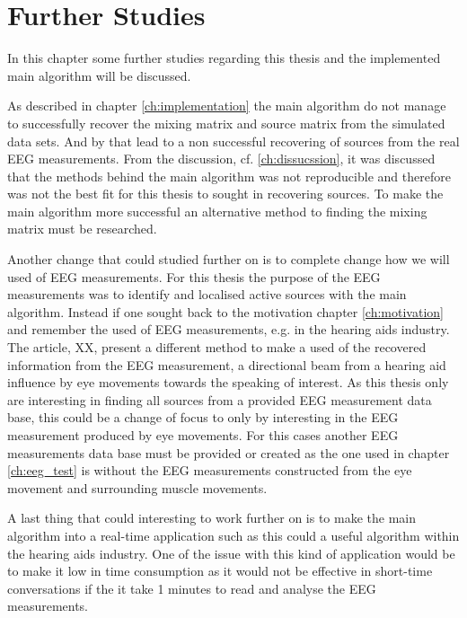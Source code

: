 \chapter{Further Studies}
In this chapter some further studies regarding this thesis and the implemented main algorithm will be discussed.

As described in chapter \ref{ch:implementation} the main algorithm do not manage to successfully recover the mixing matrix and source matrix from the simulated data sets. And by that lead to a non successful recovering of sources from the real EEG measurements. 
From the discussion, cf. \ref{ch:dissucssion}, it was discussed that the methods behind the main algorithm was not reproducible and therefore was not the best fit for this thesis to sought in recovering sources. 
To make the main algorithm more successful an alternative method to finding the mixing matrix must be researched.

Another change that could studied further on is to complete change how we will used of EEG measurements. For this thesis the purpose of the EEG measurements was to identify and localised active sources with the main algorithm. 
Instead if one sought back to the motivation chapter \ref{ch:motivation} and remember the used of EEG measurements, e.g. in the hearing aids industry. 
The article, XX, present a different method to make a used of the recovered information from the EEG measurement, a directional beam from a hearing aid influence by eye movements towards the speaking of interest. 
As this thesis only are interesting in finding all sources from a provided EEG measurement data base, this could be a change of focus to only by interesting in the EEG measurement produced by eye movements. For this cases another EEG measurements data base must be provided or created as the one used in chapter \ref{ch:eeg_test} is without the EEG measurements constructed from the eye movement and surrounding muscle movements.

A last thing that could interesting to work further on is to make the main algorithm into a real-time application such as this could a useful algorithm within the hearing aids industry. 
One of the issue with this kind of application would be to make it low in time consumption as it would not be effective in short-time conversations if the it take 1 minutes to read and analyse the EEG measurements.


